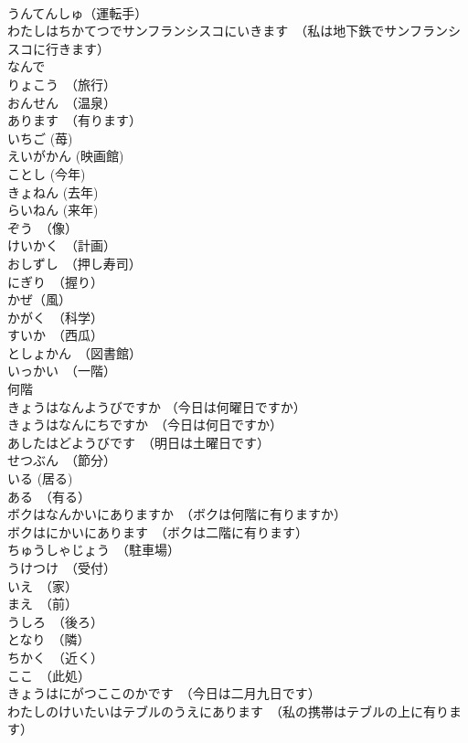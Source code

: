 \documentclass[8pt]{extreport}
\begin{document}
\begin{CJK}{UTF8}{min}
\\	うんてんしゅ（運転手）	
\\	わたしはちかてつでサンフランシスコにいきます　（私は地下鉄でサンフランシスコに行きます）	
\\	なんで	
\\	りょこう　（旅行）	
\\	おんせん　（温泉）	
\\	あります　（有ります）	
\\	いちご (苺)	
\\	えいがかん (映画館)	
\\	ことし (今年)	
\\	きょねん (去年)	
\\	らいねん (来年)	
\\	ぞう　（像）	
\\	けいかく　（計画）	
\\	おしずし　（押し寿司）	
\\	にぎり　（握り）	
\\	かぜ（風）	
\\	かがく　（科学）	
\\	すいか　（西瓜）	
\\	としょかん　（図書館）	
\\	いっかい　（一階）	
\\	何階	
\\	きょうはなんようびですか （今日は何曜日ですか）	
\\	きょうはなんにちですか　（今日は何日ですか）	
\\	あしたはどようびです　（明日は土曜日です）	
\\	せつぶん　（節分）	
\\	いる (居る)	
\\	ある　（有る）	
\\	ボクはなんかいにありますか　（ボクは何階に有りますか）	
\\	ボクはにかいにあります　（ボクは二階に有ります）	
\\	ちゅうしゃじょう　（駐車場）	
\\	うけつけ　（受付）	
\\	いえ　（家）	
\\	まえ　（前）	
\\	うしろ　（後ろ）	
\\	となり　（隣）	
\\	ちかく　（近く）	
\\	ここ　（此処）	
\\	きょうはにがつここのかです　（今日は二月九日です）	
\\	わたしのけいたいはテブルのうえにあります　（私の携帯はテブルの上に有ります）	

\end{CJK}
\end{document}
